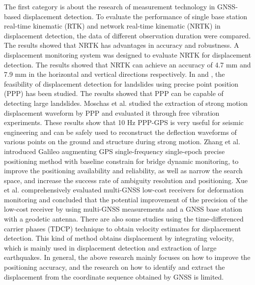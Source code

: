 \documentclass[final,3p,times]{elsarticle}
\begin{document}
	The first category is about the research of measurement technology in GNSS-based displacement detection.
	To evaluate the performance of single base station \textcolor{r_s}{real-time} kinematic (RTK) and network \textcolor{r_s}{real-time} kinematic (NRTK) in displacement detection, the data of different observation duration were compared\cite{wang2011gps}. The results showed that NRTK has advantages in accuracy and robustness.
	A displacement monitoring system was designed to evaluate NRTK for displacement detection\cite{GUMUS2019131}. The results showed that NRTK can achieve an accuracy of 4.7 mm and 7.9 mm in the horizontal and vertical directions respectively.
	In \cite{csanliouglu2016landslide} and \cite{lytvyn2012real}, the feasibility of displacement detection for landslides  using precise point position (PPP) has been studied. The results showed that PPP can be capable of detecting large landslides.
	\textcolor{r_s}{
		Moschas et al.\cite{Moschas_2014} studied the extraction of strong motion displacement waveform by PPP and evaluated it through free vibration experiments. These results show that 10 Hz PPP-GPS is very useful for seismic engineering and can be safely used to reconstruct the deflection waveforms of various points on the ground and structure during strong motion.}
	\textcolor{r_s}{Zhang et al.\cite{Meng_2019} introduced Galileo augmenting GPS single-frequency single-epoch precise positioning method with baseline constrain for bridge dynamic monitoring, to improve the positioning availability and reliability, as well as narrow the search space, and increase the success rate of ambiguity resolution and positioning.
	Xue et al.\cite{Xue2021} comprehensively evaluated multi-GNSS low-cost receivers for deformation monitoring and concluded that the potential improvement of the precision of the low-cost receiver by using multi-GNSS measurements and a GNSS base station with a geodetic antenna.}
	There are also some studies using the time-differenced carrier phases (TDCP) technique\cite{freda2015time,colosimo2011real} to obtain velocity estimates for displacement detection. This kind of method obtains displacement by integrating velocity, which is mainly used in displacement detection and extraction of large earthquakes.
	In general, the above research mainly focuses on how to improve the positioning accuracy, and the research on how to identify and extract the displacement from the coordinate sequence obtained by GNSS is limited.
	
\end{document}

